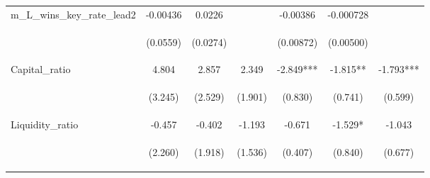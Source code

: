 \documentclass[]{article}
\begin{document}
\begin{center}
\begin{tabular}{lcccccc}
m\_L\_wins\_key\_rate\_lead2 & -0.00436 & 0.0226 &  & -0.00386 & -0.000728 &  \\
\vspace{4pt} & \begin{footnotesize}(0.0559)\end{footnotesize} & \begin{footnotesize}(0.0274)\end{footnotesize} & \begin{footnotesize}\end{footnotesize} & \begin{footnotesize}(0.00872)\end{footnotesize} & \begin{footnotesize}(0.00500)\end{footnotesize} & \begin{footnotesize}\end{footnotesize} \\
Capital\_ratio & 4.804 & 2.857 & 2.349 & -2.849*** & -1.815** & -1.793*** \\
\vspace{4pt} & \begin{footnotesize}(3.245)\end{footnotesize} & \begin{footnotesize}(2.529)\end{footnotesize} & \begin{footnotesize}(1.901)\end{footnotesize} & \begin{footnotesize}(0.830)\end{footnotesize} & \begin{footnotesize}(0.741)\end{footnotesize} & \begin{footnotesize}(0.599)\end{footnotesize} \\
Liquidity\_ratio & -0.457 & -0.402 & -1.193 & -0.671 & -1.529* & -1.043 \\
\vspace{4pt} & \begin{footnotesize}(2.260)\end{footnotesize} & \begin{footnotesize}(1.918)\end{footnotesize} & \begin{footnotesize}(1.536)\end{footnotesize} & \begin{footnotesize}(0.407)\end{footnotesize} & \begin{footnotesize}(0.840)\end{footnotesize} & \begin{footnotesize}(0.677)\end{footnotesize} \\

\end{tabular}
\end{center}
\end{document}
